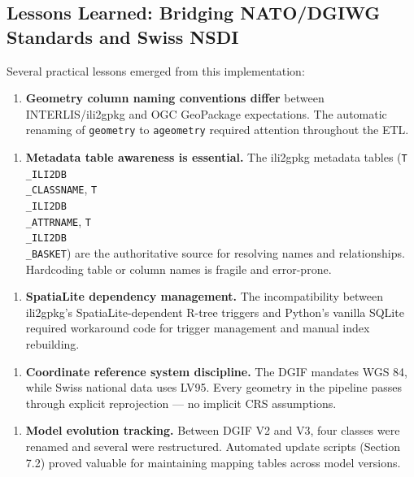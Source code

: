 \documentclass[conference]{IEEEtran}
\begin{document}
\subsection{Lessons Learned: Bridging NATO/DGIWG Standards and Swiss NSDI}

Several practical lessons emerged from this implementation:

\begin{enumerate}[leftmargin=*]
\item \textbf{Geometry column naming conventions differ} between INTERLIS/ili2gpkg and OGC GeoPackage expectations. The automatic renaming of \texttt{geometry} to \texttt{ageometry} required attention throughout the ETL.
\end{enumerate}

\begin{enumerate}[leftmargin=*]
\item \textbf{Metadata table awareness is essential.} The ili2gpkg metadata tables (\texttt{T\\_ILI2DB\\_CLASSNAME}, \texttt{T\\_ILI2DB\\_ATTRNAME}, \texttt{T\\_ILI2DB\\_BASKET}) are the authoritative source for resolving names and relationships. Hardcoding table or column names is fragile and error-prone.
\end{enumerate}

\begin{enumerate}[leftmargin=*]
\item \textbf{SpatiaLite dependency management.} The incompatibility between ili2gpkg's SpatiaLite-dependent R-tree triggers and Python's vanilla SQLite required workaround code for trigger management and manual index rebuilding.
\end{enumerate}

\begin{enumerate}[leftmargin=*]
\item \textbf{Coordinate reference system discipline.} The DGIF mandates WGS 84, while Swiss national data uses LV95. Every geometry in the pipeline passes through explicit reprojection — no implicit CRS assumptions.
\end{enumerate}

\begin{enumerate}[leftmargin=*]
\item \textbf{Model evolution tracking.} Between DGIF V2 and V3, four classes were renamed and several were restructured. Automated update scripts (Section 7.2) proved valuable for maintaining mapping tables across model versions.
\end{enumerate}
\end{document}
